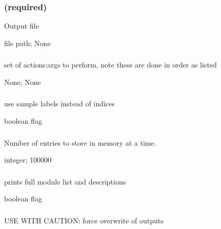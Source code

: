 \documentclass[letterpaper,11pt,english]{sphinxmanual}
\begin{document}
\subsubsection{ (required)}
\label{\detokenize{prog_desc:id94}}
 Output file

 file path;  None


\subsubsection{}
\label{\detokenize{prog_desc:actions}}
 set of actions:args to perform, note these are done in order as listed

 None;  None


\subsubsection{}
\label{\detokenize{prog_desc:labels}}
 use sample labels instead of indices

 boolean flag


\subsubsection{}
\label{\detokenize{prog_desc:id95}}
 Number of entries to store in memory at a time.

 integer;  100000


\subsubsection{}
\label{\detokenize{prog_desc:more-help-morehelp}}
 prints full module list and descriptions

 boolean flag


\subsubsection{}
\label{\detokenize{prog_desc:id96}}
 USE WITH CAUTION: force overwrite of outputs
\end{document}
